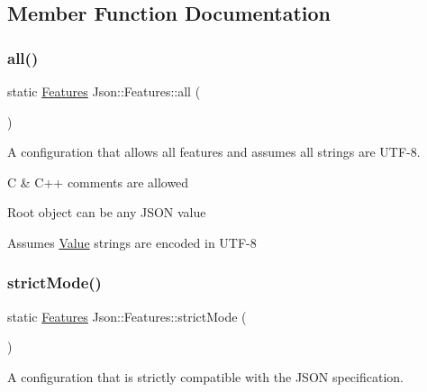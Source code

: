 \subsection{Member Function Documentation}
\mbox{\label{class_json_1_1_features_a9f17db1b4ebbef8c645825344959481b}} 
\subsubsection{\texorpdfstring{all()}{all()}}
{\footnotesize\ttfamily static \mbox{\hyperlink{class_json_1_1_features}{Features}} Json\+::\+Features\+::all (\begin{DoxyParamCaption}{ }\end{DoxyParamCaption})\hspace{0.3cm}{\ttfamily [static]}}



A configuration that allows all features and assumes all strings are U\+T\+F-\/8. 


\begin{DoxyItemize}
\item C \& C++ comments are allowed
\item Root object can be any J\+S\+ON value
\item Assumes \mbox{\hyperlink{class_json_1_1_value}{Value}} strings are encoded in U\+T\+F-\/8 
\end{DoxyItemize}\mbox{\label{class_json_1_1_features_aed3a2845df0cfd2ebe7338442361bd13}} 
\subsubsection{\texorpdfstring{strictMode()}{strictMode()}}
{\footnotesize\ttfamily static \mbox{\hyperlink{class_json_1_1_features}{Features}} Json\+::\+Features\+::strict\+Mode (\begin{DoxyParamCaption}{ }\end{DoxyParamCaption})\hspace{0.3cm}{\ttfamily [static]}}



A configuration that is strictly compatible with the J\+S\+ON specification. 


